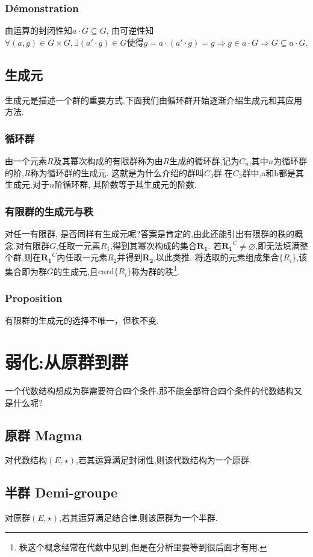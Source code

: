\documentclass[12pt, a4paper, oneside]{ctexbook}
\begin{document}
  \subsubsection{Démonstration}
  由运算的封闭性知$a\cdot G\subseteq G$,
  由可逆性知$\forall (a,g)\in G\times G, \exists (a'\cdot g)\in G\text{使得}g=a\cdot (a'\cdot g)=g\Rightarrow g\in a\cdot G\Rightarrow G\subseteq a\cdot G$.
  \subsection{生成元}
  生成元是描述一个群的重要方式.下面我们由循环群开始逐渐介绍生成元和其应用方法.
  \subsubsection{循环群}
  由一个元素$R$及其幂次构成的有限群称为由$R$生成的循环群,记为$C_n$,其中$n$为循环群的阶,$R$称为循环群的生成元.
  这就是为什么介绍的群叫$C_3$群.在$C_3$群中,a和b都是其生成元.对于$n$阶循环群, 其阶数等于其生成元的阶数.
  \subsubsection{有限群的生成元与秩}
  对任一有限群, 是否同样有生成元呢?答案是肯定的,由此还能引出有限群的秩的概念.对有限群$G$,任取一元素$R_1$,得到其幂次构成的集合$\mathbf{R_1}$.
  若$\mathbf{R_1}^C\neq \varnothing$,即无法填满整个群,则在$\mathbf{R_1}^C$内任取一元素$R_2$并得到$\mathbf{R_2}$,以此类推.
  将选取的元素组成集合$\{R_i\}$,该集合即为群$G$的生成元,且$\text{card}\{R_i\}$称为群的秩\footnote{秩这个概念经常在代数中见到,但是在分析里要等到很后面才有用.}.
  \subsubsection{Proposition}
  有限群的生成元的选择不唯一，但秩不变.

  \section{弱化:从原群到群}
  一个代数结构想成为群需要符合四个条件,那不能全部符合四个条件的代数结构又是什么呢?
  \subsection{原群 Magma}
  对代数结构$(E,\star)$,若其运算满足封闭性,则该代数结构为一个原群.

  \subsection{半群 Demi-groupe}
  对原群$(E,\star)$,若其运算满足结合律,则该原群为一个半群.
\end{document}
